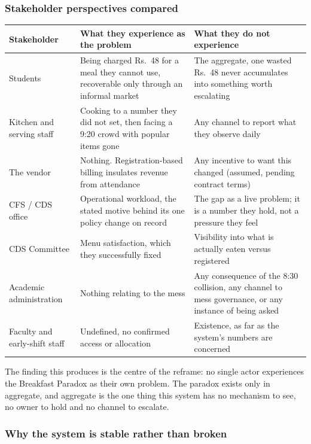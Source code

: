 \documentclass[11pt]{article}
\newcommand{\rs}{Rs.\ }
\begin{document}
\subsubsection*{Stakeholder perspectives compared}

\begin{longtable}{L{0.22\textwidth}L{0.36\textwidth}L{0.36\textwidth}}
\toprule
\textbf{Stakeholder} & \textbf{What they experience as the problem} & \textbf{What they do not
experience} \\
\midrule
\endhead
Students & Being charged \rs 48 for a meal they cannot use, recoverable only through an informal
market & The aggregate, one wasted \rs 48 never accumulates into something worth escalating \\[4pt]
Kitchen and serving staff & Cooking to a number they did not set, then facing a 9:20 crowd with
popular items gone & Any channel to report what they observe daily \\[4pt]
The vendor & Nothing. Registration-based billing insulates revenue from attendance & Any incentive
to want this changed (assumed, pending contract terms) \\[4pt]
CFS / CDS office & Operational workload, the stated motive behind its one policy change on
record & The gap as a live problem; it is a number they hold, not a pressure they feel \\[4pt]
CDS Committee & Menu satisfaction, which they successfully fixed & Visibility into what is actually
eaten versus registered \\[4pt]
Academic administration & Nothing relating to the mess & Any consequence of the 8:30 collision, any
channel to mess governance, or any instance of being asked \\[4pt]
Faculty and early-shift staff & Undefined, no confirmed access or allocation & Existence, as far
as the system's numbers are concerned \\
\bottomrule
\end{longtable}

\noindent The finding this produces is the centre of the reframe: no single actor experiences the
Breakfast Paradox as their own problem. The paradox exists only in aggregate, and aggregate is the
one thing this system has no mechanism to see, no owner to hold and no channel to escalate.

\subsubsection*{Why the system is stable rather than broken}
\end{document}
